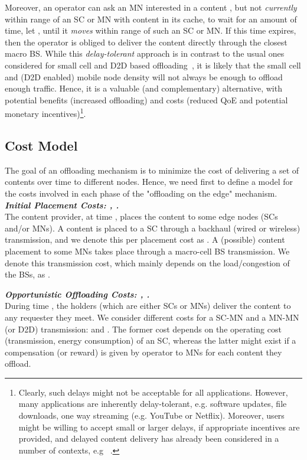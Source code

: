 \documentclass[10pt,conference,letterpaper]{IEEEtran}
\begin{document}
Moreover, an operator can ask an MN interested in a content , but not \emph{currently} within range of an SC or MN with content  in its cache, to wait for an amount of time, let , until it \emph{moves} within range of such an SC or MN. If this time expires, then the operator is obliged to deliver the content directly through the closest macro BS. While this \textit{delay-tolerant} approach is in contrast to the usual ones considered for small cell and D2D based offloading~\cite{femtocaching,caire-d2d-caching-limits,poularakis-video-HetNets}, it is likely that the small cell and (D2D enabled) mobile node density will not always be enough to offload enough traffic. Hence, it is a valuable (and complementary) alternative, with potential benefits (increased offloading) and costs (reduced QoE and potential monetary incentives)\footnote{Clearly, such delays might not be acceptable for all applications. However, many applications are inherently delay-tolerant, e.g. software updates, file downloads, one way streaming (e.g. YouTube or Netflix). Moreover, users might be willing to accept small or larger delays, if appropriate incentives are provided, and delayed content delivery has already been considered in a number of contexts, e.g~\cite{tube,push-to-peer}
.}.


\subsection{Cost Model}\label{sec:cost-model}
The goal of an offloading mechanism is to minimize the cost of delivering a set of contents over time to different nodes. Hence, we need first to define a model for the costs involved in each phase of the "offloading on the edge" mechanism.\\
\noindent \textbf{\textit{ Initial Placement Costs: , .}}\\
The content provider, at time , places the content to some edge nodes (SCs and/or MNs). A content is placed to a SC through a backhaul (wired or wireless) transmission, and we denote this per placement cost as . A (possible) content placement to some MNs takes place through a macro-cell BS transmission. We denote this transmission cost, which mainly depends on the load/congestion of the BSs, as .

\noindent \textbf{\textit{ Opportunistic Offloading Costs:  , .}}\\
During time , the holders (which are either SCs or MNs) deliver the content to any requester they meet. We consider different costs for a SC-MN and a MN-MN (or D2D) transmission:  and . The former cost depends on the operating cost (transmission, energy consumption) of an SC, whereas the latter might exist if a compensation (or reward) is given by operator to MNs for each content they offload.
\end{document}
